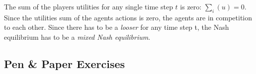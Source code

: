 \documentclass[twoside,english,colorbacktitle,accentcolor=tud9c,10pt]{tudexercise}
\begin{document}
\begin{questions}
		 The sum of the players utilities  for any single time step $t$ is zero:  $\sum_i(u) = 0$.
		\newline
		[Competition.] Since the utilities sum of the agents actions is zero, the agents are in competition to each other.
		 Since there has to be a \textit{looser} for any time step t, the Nash equilibrium has to be a \textit{mixed Nash equilibrium}.
		\newline
		


\end{questions}

\clearpage


\subsection{Pen \& Paper Exercises}
\end{document}
